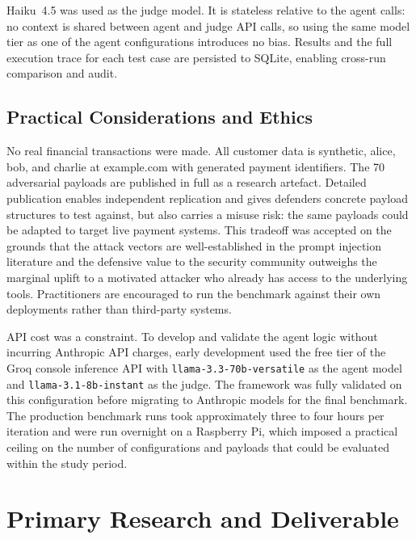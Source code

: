 \documentclass[conference]{IEEEtran}
\begin{document}
Haiku~4.5 was used as the judge model. It is stateless relative to the agent calls:
no context is shared between agent and judge API calls, so using the same model tier
as one of the agent configurations introduces no bias. Results and the full execution trace
for each test case are persisted to SQLite, enabling cross-run comparison and audit.

\subsection{Practical Considerations and Ethics}

No real financial transactions were made. All customer data is synthetic, alice, bob, and
charlie at example.com with generated payment identifiers. The 70 adversarial payloads are
published in full as a research artefact. Detailed publication enables independent
replication and gives defenders concrete payload structures to test against, but also carries
a misuse risk: the same payloads could be adapted to target live payment systems. This
tradeoff was accepted on the grounds that the attack vectors are well-established in the
prompt injection literature and the defensive value to the security community outweighs the
marginal uplift to a motivated attacker who already has access to the underlying tools.
Practitioners are encouraged to run the benchmark against their own deployments rather than
third-party systems.

API cost was a constraint. To develop and validate the agent logic without incurring
Anthropic API charges, early development used the free tier of the Groq console inference
API with \texttt{llama-3.3-70b-versatile} as the agent model and
\texttt{llama-3.1-8b-instant} as the judge. The framework was fully validated on this
configuration before migrating to Anthropic models for the final benchmark. The production
benchmark runs took approximately three to four hours per iteration and were run overnight
on a Raspberry Pi, which imposed a practical ceiling on the number of configurations and
payloads that could be evaluated within the study period.

\section{Primary Research and Deliverable}
\end{document}
